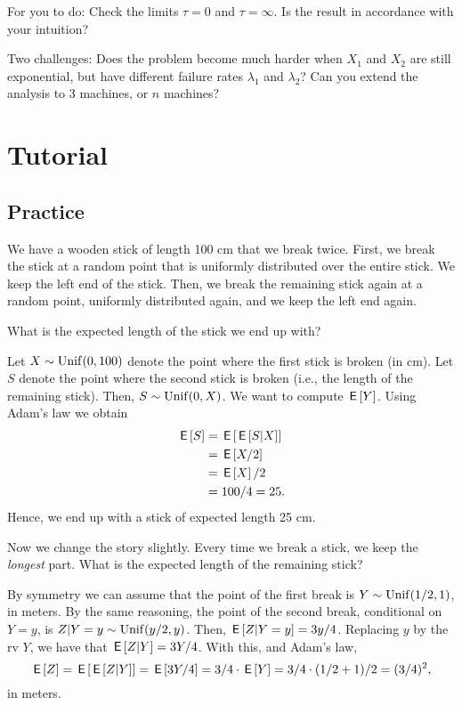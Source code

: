 \begin{exercise}
\begin{solution}
For you to do: Check the limits $\tau=0$ and $\tau=\infty$. Is the result in accordance with your intuition?

Two challenges: Does the problem become much harder when $X_{1}$ and $X_{2}$ are still exponential, but have different failure rates $\lambda_1$ and $\lambda_{2}$? Can you extend the analysis to 3 machines, or $n$ machines?

\end{solution}
\end{exercise}


\section{Tutorial}
\label{sec:tutorial}


\subsection{Practice}

We have a wooden stick of length 100 cm that we break twice.
First, we break the stick at a random point that is uniformly distributed over the entire stick.
We keep the left end of the stick.
Then, we break the remaining stick again at a random point, uniformly distributed again, and we keep the left end again.

\begin{exercise}
What is the expected length of the stick we end up with?
\begin{solution}
Let $X \sim \mathrm{Unif}(0,100)$ denote the point where the first stick is broken (in cm). Let $S$ denote the point where the second stick is broken (i.e., the length of the remaining stick). Then, $S \sim \mathrm{Unif}(0,X)$. We want to compute $\,\mathsf{E}\left[Y\right]$. Using Adam's law we obtain
\begin{align}
    \,\mathsf{E}\left[S\right] &= \,\mathsf{E}\left[\,\mathsf{E}\left[S|X\right]\right] \\
    &= \,\mathsf{E}\left[X/2\right] \\
    &= \,\mathsf{E}\left[X\right]/2 \\
    &= 100/4 = 25.
\end{align}
Hence, we end up with a stick of expected length 25 cm.
\end{solution}
\end{exercise}

\begin{exercise}
Now we change the story slightly. Every time we break a stick, we keep the \textit{longest} part. What is the expected length of the remaining stick?
\begin{solution}
By symmetry we can assume that the point of the first break is $Y\sim\mathrm{Unif}(1/2, 1)$, in meters. By the same reasoning, the point of the second break, conditional on $Y=y$, is $Z|Y=y \sim \mathrm{Unif}(y/2, y)$. Then, $\,\mathsf{E}\left[Z|Y=y\right] = 3y/4$. Replacing $y$ by the rv $Y$, we have that $\,\mathsf{E}\left[Z|Y\right] = 3 Y/4$. With this, and Adam's law,
\begin{equation}
\,\mathsf{E}\left[Z\right] = \,\mathsf{E}\left[\,\mathsf{E}\left[Z|Y\right]\right] = \,\mathsf{E}\left[3Y/4\right] = 3/4\cdot \,\mathsf{E}\left[Y\right]= 3/4\cdot (1/2+1)/2 = (3/4)^{2},
\end{equation}
in meters.

\end{solution}
\end{exercise}


